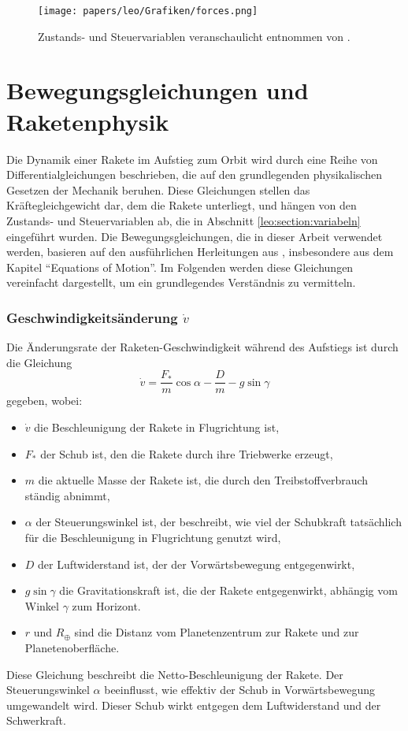 \begin{figure}
	\centering
	\texttt{[image: papers/leo/Grafiken/forces.png]}
	\caption{Zustands- und Steuervariablen veranschaulicht entnommen von \cite{leo:astronautics}.}
	\label{fig:leo:forces}
\end{figure}



\section{Bewegungsgleichungen und Raketenphysik \label{leo:section:beweungsgleichungen}}

Die Dynamik einer Rakete im Aufstieg zum Orbit wird durch eine Reihe von Differentialgleichungen beschrieben, die auf den grundlegenden physikalischen Gesetzen der Mechanik beruhen. 
Diese Gleichungen stellen das Kräftegleichgewicht dar, dem die Rakete unterliegt, und hängen von den Zustands- und Steuervariablen ab, die in Abschnitt \ref{leo:section:variabeln} eingeführt wurden. 
Die Bewegungsgleichungen, die in dieser Arbeit verwendet werden, basieren auf den ausführlichen Herleitungen aus \cite{leo:astronautics}, insbesondere aus dem Kapitel ``Equations of Motion''. 
Im Folgenden werden diese Gleichungen vereinfacht dargestellt, um ein grundlegendes Verständnis zu vermitteln.

\subsubsection{Geschwindigkeitsänderung \(\dot{v}\)}
Die Änderungsrate der Raketen-Geschwindigkeit während des Aufstiegs ist durch die Gleichung
\[
\dot{v} = \frac{F_*}{m} \cos \alpha - \frac{D}{m} - g \sin \gamma
\]
gegeben, wobei:
\begin{itemize}
	\item \(\dot{v}\) die Beschleunigung der Rakete in Flugrichtung ist,
	\item \(F_*\) der Schub ist, den die Rakete durch ihre Triebwerke erzeugt,
	\item \(m\) die aktuelle Masse der Rakete ist, die durch den Treibstoffverbrauch ständig abnimmt,
	\item \(\alpha\) der Steuerungswinkel ist, der beschreibt, wie viel der Schubkraft tatsächlich für die Beschleunigung in Flugrichtung genutzt wird,
	\item \(D\) der Luftwiderstand ist, der der Vorwärtsbewegung entgegenwirkt,
	\item \(g \sin \gamma\) die Gravitationskraft ist, die der Rakete entgegenwirkt, abhängig vom Winkel \(\gamma\) zum Horizont.
    \item \(r\) und \(R_{\oplus}\) sind die Distanz vom Planetenzentrum zur Rakete und zur Planetenoberfläche.
\end{itemize}
Diese Gleichung beschreibt die Netto-Beschleunigung der Rakete. Der Steuerungswinkel \(\alpha\) beeinflusst, wie effektiv der Schub in Vorwärtsbewegung umgewandelt wird. Dieser Schub wirkt entgegen dem Luftwiderstand und der Schwerkraft. 


